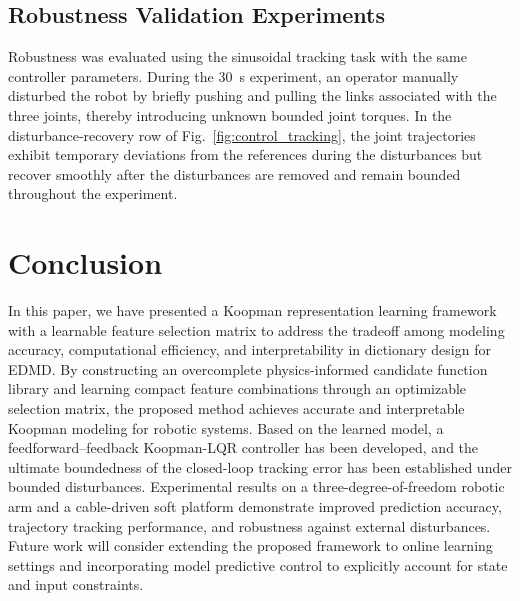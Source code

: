 \documentclass[letterpaper,10pt,conference]{ieeeconf}
\begin{document}

\subsection{Robustness Validation Experiments}
\label{subsec:robustness_test}

Robustness was evaluated using the sinusoidal tracking task with the same controller parameters. During the 30~s experiment, an operator manually disturbed the robot by briefly pushing and pulling the links associated with the three joints, thereby introducing unknown bounded joint torques. In the disturbance-recovery row of Fig.~\ref{fig:control_tracking}, the joint trajectories exhibit temporary deviations from the references during the disturbances but recover smoothly after the disturbances are removed and remain bounded throughout the experiment.





\section{Conclusion}
\label{sec:conclusion}

In this paper, we have presented a Koopman representation learning framework with a learnable feature selection matrix to address the tradeoff among modeling accuracy, computational efficiency, and interpretability in dictionary design for EDMD. By constructing an overcomplete physics-informed candidate function library and learning compact feature combinations through an optimizable selection matrix, the proposed method achieves accurate and interpretable Koopman modeling for robotic systems. Based on the learned model, a feedforward--feedback Koopman-LQR controller has been developed, and the ultimate boundedness of the closed-loop tracking error has been established under bounded disturbances. Experimental results on a three-degree-of-freedom robotic arm and a cable-driven soft platform demonstrate improved prediction accuracy, trajectory tracking performance, and robustness against external disturbances. Future work will consider extending the proposed framework to online learning settings and incorporating model predictive control to explicitly account for state and input constraints.






\end{document}
